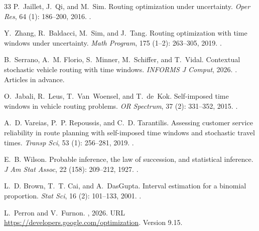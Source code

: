 \documentclass[12pt,letterpaper]{article}
\begin{document}
\begin{thebibliography}{33}
P.~Jaillet, J.~Qi, and M.~Sim.
\newblock Routing optimization under uncertainty.
\newblock \emph{Oper Res}, 64 (1): 186--200, 2016.
\newblock {}.

Y.~Zhang, R.~Baldacci, M.~Sim, and J.~Tang.
\newblock Routing optimization with time windows under uncertainty.
\newblock \emph{Math Program}, 175 (1--2): 263--305, 2019.
\newblock {}.

B.~Serrano, A.~M. Florio, S.~Minner, M.~Schiffer, and T.~Vidal.
\newblock Contextual stochastic vehicle routing with time windows.
\newblock \emph{INFORMS J Comput}, 2026.
\newblock {}.
\newblock Articles in advance.

O.~Jabali, R.~Leus, T.~Van~Woensel, and T.~de~Kok.
\newblock Self-imposed time windows in vehicle routing problems.
\newblock \emph{OR Spectrum}, 37 (2): 331--352, 2015.
\newblock {}.

A.~D. Vareias, P.~P. Repoussis, and C.~D. Tarantilis.
\newblock Assessing customer service reliability in route planning with
  self-imposed time windows and stochastic travel times.
\newblock \emph{Transp Sci}, 53 (1): 256--281, 2019.
\newblock {}.

E.~B. Wilson.
\newblock Probable inference, the law of succession, and statistical inference.
\newblock \emph{J Am Stat Assoc}, 22 (158): 209--212, 1927.
\newblock {}.

L.~D. Brown, T.~T. Cai, and A.~DasGupta.
\newblock Interval estimation for a binomial proportion.
\newblock \emph{Stat Sci}, 16 (2): 101--133, 2001.
\newblock {}.

L.~Perron and V.~Furnon.
, 2026.
\newblock URL \url{https://developers.google.com/optimization}.
\newblock Version 9.15.


\end{thebibliography}
\end{document}
